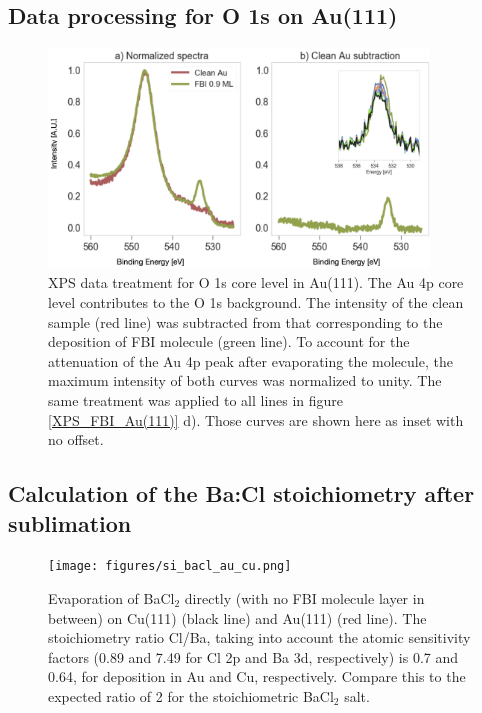 \documentclass[aps,prl,reprint,longbibliography,superscriptaddress]{revtex4-1}
\def\BaCl{BaCl$_2$ }
\begin{document}
\subsection{Data processing for O 1s on Au(111)}
\begin{figure}[ht!]
	\includegraphics[width=0.9\textwidth]{figures/si_au_subtraction.png}
	\caption{\label{Au_subtraction} 
    XPS data treatment for O 1s core level in Au(111). The Au 4p core level contributes to the O 1s background. The intensity of the clean sample (red line) was subtracted from that corresponding to the deposition of FBI molecule (green line). To account for the attenuation of the Au 4p peak after evaporating the molecule, the maximum intensity of both curves was normalized to unity. The same treatment was applied to all lines in figure \ref{XPS_FBI_Au(111)} d). Those curves are shown here as inset with no offset.}
\end{figure}  

\subsection{Calculation of the Ba:Cl stoichiometry after sublimation}

\begin{figure}[ht!]
	\texttt{[image: figures/si\_bacl\_au\_cu.png]}
	\caption{\label{Chlorine_desorption} 
    Evaporation of \BaCl directly (with no FBI molecule layer in between) on Cu(111) (black line) and Au(111) (red line). The stoichiometry ratio Cl/Ba, taking into account the atomic sensitivity factors (0.89 and 7.49 for Cl 2p and Ba 3d, respectively) is 0.7 and 0.64, for deposition in Au and Cu, respectively. Compare this to the expected ratio of 2 for the stoichiometric \BaCl salt.}
\end{figure}  
\end{document}

